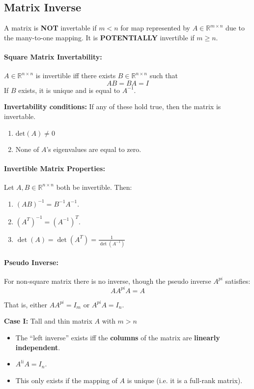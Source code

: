 \documentclass[a4paper,12pt]{report}
\def\reals{\mathbb{R}}
\begin{document}
\subsection{Matrix Inverse}

A matrix is \textbf{NOT} invertable if $m < n$ for map represented by $A \in \reals^{m\times n}$ due to the many-to-one mapping. It is \textbf{POTENTIALLY} invertible if $m \geq n$.

\paragraph{Square Matrix Invertability: } $A\in\reals^{n\times n}$ is invertible iff there exists $B\in\reals^{n\times n}$ such that \begin{equation}
AB = BA = I
\end{equation}
If $B$ exists, it is unique and is equal to $A^{-1}$.


\textbf{Invertability conditions: } If any of these hold true, then the matrix is invertable.
\begin{enumerate}
\item $\text{det}(A) \neq 0$
\item None of $A$'s eigenvalues are equal to zero.
\end{enumerate}

\paragraph{Invertible Matrix Properties: } Let $A, B \in \reals^{n\times n}$ both be invertible. Then: 
\begin{enumerate}
\item $(AB)^{-1} = B^{-1} A^{-1}$.
\item $(A^T)^{-1} = (A^{-1})^T$.
\item $\det(A) = \det(A^T) = \frac{1}{\det(A^{-1})}$
\end{enumerate}

\paragraph{Pseudo Inverse: } For non-square matrix there is no inverse, though the pseudo inverse $A^{pi}$ satisfies: 
\begin{equation}
AA^{pi}A = A
\end{equation}

That is, either $AA^{pi} = I_m$ or $A^{pi}A = I_n$.


\textbf{Case I: } Tall and thin matrix $A$ with $m > n$
\begin{itemize}
\item The ``left inverse'' exists iff the \textbf{columns} of the matrix are \textbf{linearly independent}.
\item $A^{li} A = I_n$.
\item This only exists if the mapping of $A$ is unique (i.e. it is a full-rank matrix).
\end{itemize}
\end{document}
